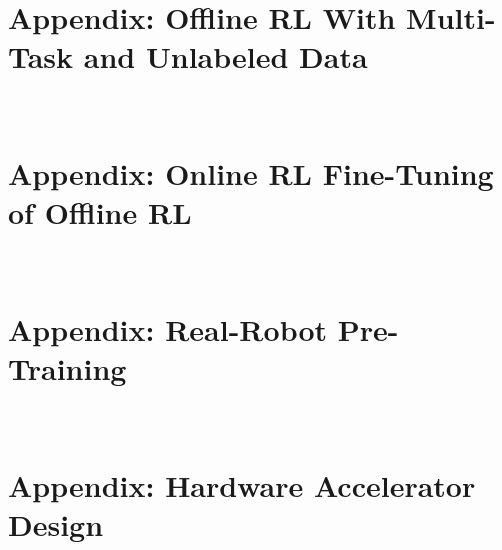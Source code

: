 \documentclass[letterpaper,12pt, oneside]{lib/ucthesis}
\begin{document}
\begin{dissertationText}
\chapter{Appendix: Offline RL With Multi-Task and Unlabeled Data}~\label{sec:appendix-cds-uds}


\chapter{Appendix: Online RL Fine-Tuning of Offline RL}~\label{sec:appendix-calql}


\chapter{Appendix: Real-Robot Pre-Training}~\label{sec:appendix-ptr}


\chapter{Appendix: Hardware Accelerator Design}~\label{sec:appendix-prime}



\end{dissertationText}
\end{document}
